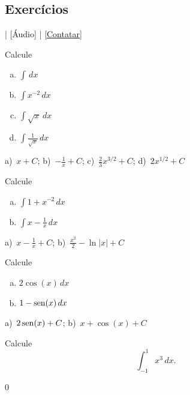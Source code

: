 \subsection{Exercícios}

\begin{flushright}
  [Vídeo] | [Áudio] | \href{https://phkonzen.github.io/notas/contato.html}{[Contatar]}
\end{flushright}

\begin{exer}
  Calcule
  \begin{enumerate}[a)]
  \item $\displaystyle \int \,dx$
  \item $\displaystyle \int x^{-2}\,dx$
  \item $\displaystyle \int \sqrt{x}\,dx$
  \item $\displaystyle \int \frac{1}{\sqrt{x}}\,dx$
  \end{enumerate}
\end{exer}
\begin{resp}
  a)~$\displaystyle x + C$; b)~$\displaystyle -\frac{1}{x} + C$; c)~$\displaystyle \frac{2}{3}x^{3/2} + C$; d)~$\displaystyle 2x^{1/2} + C$
\end{resp}

\begin{exer}
  Calcule
  \begin{enumerate}[a)]
  \item $\displaystyle \int 1 + x^{-2}\,dx$
  \item $\displaystyle \int x - \frac{1}{x}\,dx$
  \end{enumerate}
\end{exer}
\begin{resp}
  a)~$\displaystyle x-\frac{1}{x}+C$; b)~$\displaystyle \frac{x^2}{2} - \ln|x| + C$
\end{resp}

\begin{exer}
  Calcule
  \begin{enumerate}[a)]
  \item $\displaystyle 2\cos(x)\,dx$
  \item $\displaystyle 1 - \operatorname{sen}(x)\,dx$
  \end{enumerate}
\end{exer}
\begin{resp}
  a)~$\displaystyle 2\operatorname{sen}(x) + C$; b)~$\displaystyle x + \cos(x) + C$
\end{resp}

\begin{exer}
  Calcule
  \begin{equation}
    \int_{-1}^1 x^3\,dx.
  \end{equation}
\end{exer}
\begin{resp}
  $0$
\end{resp}

